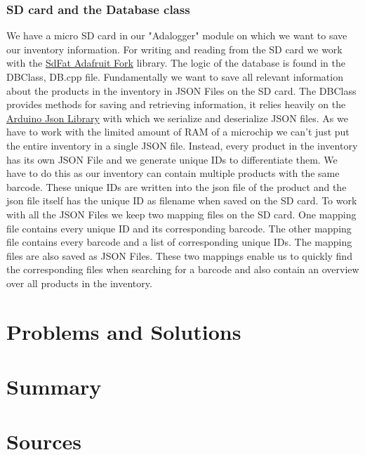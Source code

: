 \documentclass{article}
\begin{document}
\subsubsection{SD card and the Database class}
We have a micro SD card in our "Adalogger" module on which we want to save our inventory information.
For writing and reading from the SD card we work with the \href{https://github.com/adafruit/SdFat}{SdFat Adafruit Fork} library.
The logic of the database is found in the DBClass, DB.cpp file. Fundamentally we want to save all relevant information about the products in the inventory in JSON Files on the SD card.
The DBClass provides methods for saving and retrieving information, it relies heavily on the \href{https://github.com/bblanchon/ArduinoJson}{Arduino Json Library} with which we serialize and deserialize JSON files.
As we have to work with the limited amount of RAM of a microchip we can't just put the entire inventory in a single JSON file.
Instead, every product in the inventory has its own JSON File and we generate unique IDs to differentiate them. We have to do this as our inventory can contain multiple products with the same barcode.
These unique IDs are written into the json file of the product and the json file itself has the unique ID as filename when saved on the SD card.
To work with all the JSON Files we keep two mapping files on the SD card. One mapping file contains every unique ID and its corresponding barcode.
The other mapping file contains every barcode and a list of corresponding unique IDs. The mapping files are also saved as JSON Files.
These two mappings enable us to quickly find the corresponding files when searching for a barcode and also contain an overview over all products in the inventory.

\section{Problems and Solutions}


\section{Summary}

\section{Sources}





\end{document}
